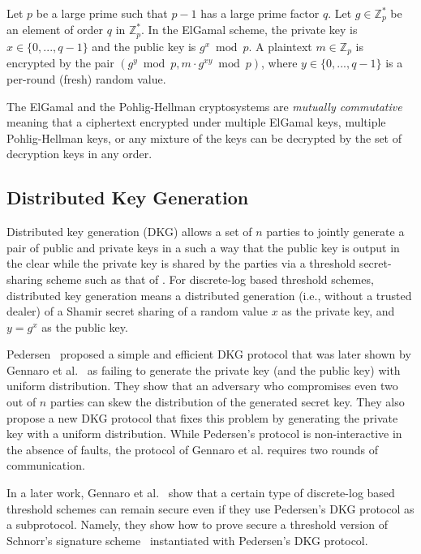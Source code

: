 \documentclass[10pt]{article}
\theoremstyle{plain}
\begin{document}
Let $p$ be a large prime such that $p-1$ has a large prime factor
$q$. Let $g\in\mathbb{Z}_{p}^{*}$ be an element of order $q$ in
$\mathbb{Z}_{p}^{*}$. In the ElGamal scheme, the private key is $x\in\{0,...,q-1\}$
and the public key is $g^{x}\bmod p$. A plaintext $m\in\mathbb{Z}_{p}$
is encrypted by the pair $(g^{y}\bmod p,m\cdot g^{xy}\bmod p)$, where
$y\in\{0,...,q-1\}$ is a per-round (fresh) random value. 

The ElGamal and the Pohlig-Hellman cryptosystems are \emph{mutually
	commutative} meaning that a ciphertext encrypted under multiple ElGamal
keys, multiple Pohlig-Hellman keys, or any mixture of the keys can
be decrypted by the set of decryption keys in any order.

\subsection{Distributed Key Generation}

Distributed key generation (DKG) allows a set of $n$ parties to jointly
generate a pair of public and private keys in a such a way that the
public key is output in the clear while the private key is shared
by the parties via a threshold secret-sharing scheme such as that
of \cite{shamir:how}. For discrete-log based threshold schemes, distributed
key generation means a distributed generation (i.e., without a trusted
dealer) of a Shamir secret sharing \cite{shamir:how} of a random
value $x$ as the private key, and $y=g^{x}$ as the public key.

Pedersen~\cite{pedersen1991threshold} proposed a simple and efficient
DKG protocol that was later shown by Gennaro et al.~\cite{Gennaro1999}
as failing to generate the private key (and the public key) with uniform
distribution. They show that an adversary who compromises even two
out of $n$ parties can skew the distribution of the generated secret
key. They also propose a new DKG protocol that fixes this problem
by generating the private key with a uniform distribution. While Pedersen\textquoteright s
protocol is non-interactive in the absence of faults, the protocol
of Gennaro et al. requires two rounds of communication.

In a later work, Gennaro et al.~\cite{Gennaro03revisitingthe} show
that a certain type of discrete-log based threshold schemes can remain
secure even if they use Pedersen\textquoteright s DKG protocol as
a subprotocol. Namely, they show how to prove secure a threshold version
of Schnorr\textquoteright s signature scheme~\cite{Schnorr:1989:EIS:646754.705037}
instantiated with Pedersen\textquoteright s DKG protocol.
\end{document}
